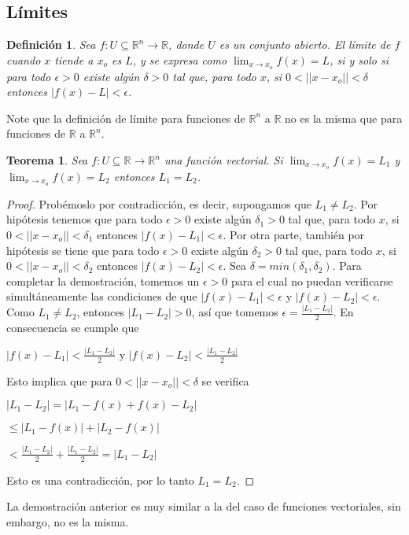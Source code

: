 \documentclass{book}
\newtheorem{theorem}{Teorema}[section]
\newtheorem{definition}{Definición}[section]
\begin{document}
\subsection{Límites}
\begin{definition}
Sea $f:U\subseteq \mathbb{R}^n \rightarrow \mathbb{R}$, donde $U$ es un conjunto abierto. El límite de $f$ cuando $x$ tiende a $x_o$ es $L$, y se expresa como $\displaystyle \lim_{x \to x_o}f(x)=L$, si y solo si para todo $\epsilon > 0$ existe algún $\delta > 0$ tal que, para todo $x$, si $0<||x-x_o||<\delta$ entonces $|f(x)-L|<\epsilon$.
\end{definition}
Note que la definición de límite para funciones de $\mathbb{R}^n$ a $\mathbb{R}$ no es la misma que para funciones de $\mathbb{R}$ a $\mathbb{R}^n$.
\begin{theorem}
Sea $f:U \subseteq \mathbb{R} \rightarrow \mathbb{R}^n$ una función vectorial. Si $\displaystyle \lim_{x \to x_o}f(x)=L_1$ y $\displaystyle \lim_{x \to x_o}f(x)=L_2$ entonces $L_1=L_2$. 
\end{theorem}
\begin{proof}
 Probémoslo por contradicción, es decir, supongamos que $L_1 \neq L_2$. Por hipótesis tenemos que para todo $\epsilon > 0$ existe algún $\delta_1 > 0$ tal que, para todo $x$, si $0<||x-x_o||<\delta_1$ entonces $|f(x)-L_1|<\epsilon$. Por otra parte, también por hipótesis se tiene que para todo $\epsilon > 0$ existe algún $\delta_2 > 0$ tal que, para todo $x$, si $0<||x-x_o||<\delta_2$ entonces $|f(x)-L_2|<\epsilon$. Sea $\delta=min(\delta_1, \delta_2)$. Para completar la demostración, tomemos un $\epsilon>0$ para el cual no puedan verificarse simultáneamente las condiciones de que $|f(x)-L_1|<\epsilon$ y $|f(x)-L_2|<\epsilon$. Como $L_1 \neq L_2$, entonces $|L_1-L_2|>0$, así que tomemos $\epsilon=\frac{|L_1-L_2|}{2}$. En consecuencia se cumple que 
 
 \begin{center}
       $|f(x)-L_1|<\frac{|L_1-L_2|}{2}$ y $|f(x)-L_2|<\frac{|L_1-L_2|}{2}$
\end{center}

Esto implica que para $0<||x-x_o||<\delta$ se verifica

\begin{center}
       $|L_1-L_2|=|L_1-f(x)+f(x)-L_2|$
\end{center}
\begin{center}
       $\leq|L_1-f(x)|+|L_2-f(x)|$
\end{center}
\begin{center}
       $<\frac{|L_1-L_2|}{2}+\frac{|L_1-L_2|}{2}=|L_1-L_2|$
\end{center}

Esto es una contradicción, por lo tanto $L_1=L_2$.
\end{proof}
La demostración anterior es muy similar a la del caso de funciones vectoriales, sin embargo, no es la misma.
\end{document}
